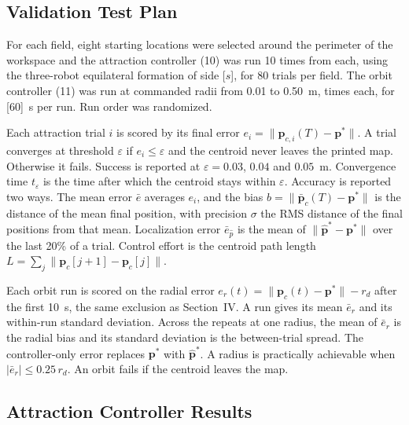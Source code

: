 \documentclass[lettersize,journal]{IEEEtran}
\newcommand{\open}[1]{\textcolor{blue!70!black}{[#1]}}
\begin{document}
\setcounter{section}{4}
\setcounter{subsection}{1}
\subsection{Validation Test Plan}

For each field, eight starting locations were selected around the perimeter of the workspace and the attraction controller (10) was run 10 times from each, using the three-robot equilateral formation of side \open{$s$}, for 80 trials per field. The orbit controller (11) was run at \VtxOrbThreeRadii{} commanded radii from 0.01 to 0.50~m, \VtxOrbThreeTrials{} times each, for \open{60}~s per run. Run order was randomized.

Each attraction trial $i$ is scored by its final error $e_i = \|\mathbf{p}_{c,i}(T) - \mathbf{p}^*\|$. A trial converges at threshold $\varepsilon$ if $e_i \le \varepsilon$ and the centroid never leaves the printed map. Otherwise it fails. Success is reported at $\varepsilon = 0.03$, $0.04$ and $0.05$~m. Convergence time $t_\varepsilon$ is the time after which the centroid stays within $\varepsilon$. Accuracy is reported two ways. The mean error $\bar e$ averages $e_i$, and the bias $b = \|\bar{\mathbf{p}}_c(T) - \mathbf{p}^*\|$ is the distance of the mean final position, with precision $\sigma$ the RMS distance of the final positions from that mean. Localization error $\bar e_{\hat p}$ is the mean of $\|\hat{\mathbf{p}}^* - \mathbf{p}^*\|$ over the last 20\% of a trial. Control effort is the centroid path length $L = \sum_j \|\mathbf{p}_c[j{+}1] - \mathbf{p}_c[j]\|$.

Each orbit run is scored on the radial error $e_r(t) = \|\mathbf{p}_c(t) - \mathbf{p}^*\| - r_d$ after the first 10~s, the same exclusion as Section~IV. A run gives its mean $\bar e_r$ and its within-run standard deviation. Across the repeats at one radius, the mean of $\bar e_r$ is the radial bias and its standard deviation is the between-trial spread. The controller-only error replaces $\mathbf{p}^*$ with $\hat{\mathbf{p}}^*$. A radius is practically achievable when $|\bar e_r| \le 0.25\,r_d$. An orbit fails if the centroid leaves the map.

\subsection{Attraction Controller Results}
\end{document}
